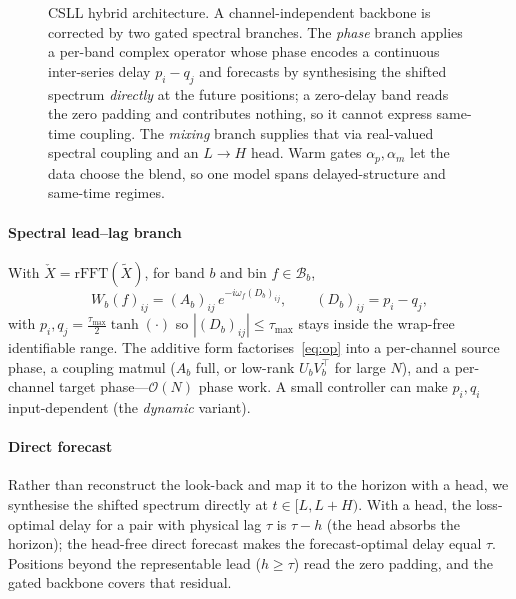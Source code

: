 \documentclass[journal,a4paper]{IEEEtran}
\begin{document}
\begin{figure}[t]
{}
\caption{CSLL hybrid architecture. A channel-independent backbone is corrected by two gated
spectral branches. The \emph{phase} branch applies a per-band complex operator whose phase encodes
a continuous inter-series delay $p_i{-}q_j$ and forecasts by synthesising the shifted spectrum
\emph{directly} at the future positions; a zero-delay band reads the zero padding and contributes
nothing, so it cannot express same-time coupling. The \emph{mixing} branch supplies that via
real-valued spectral coupling and an $L{\to}H$ head. Warm gates $\alpha_p,\alpha_m$ let the data
choose the blend, so one model spans delayed-structure and same-time regimes.}
\label{fig:arch}
\end{figure}

\paragraph{Spectral lead--lag branch} With $\check X=\mathrm{rFFT}(\tilde X)$, for band $b$ and
bin $f\in\mathcal{B}_b$,
\begin{equation}\label{eq:op}
W_b(f)_{ij}=(A_b)_{ij}\,e^{-i\omega_f (D_b)_{ij}},\qquad (D_b)_{ij}=p_i-q_j,
\end{equation}
with $p_i,q_j=\tfrac{\tau_{\max}}{2}\tanh(\cdot)$ so $|(D_b)_{ij}|\le\tau_{\max}$ stays inside the
wrap-free identifiable range. The additive form factorises~\eqref{eq:op} into a per-channel source
phase, a coupling matmul ($A_b$ full, or low-rank $U_bV_b^\top$ for large $N$), and a per-channel
target phase---$\mathcal{O}(N)$ phase work. A small controller can make $p_i,q_i$ input-dependent
(the \emph{dynamic} variant).

\paragraph{Direct forecast} Rather than reconstruct the look-back and map it to the horizon with a
head, we synthesise the shifted spectrum directly at $t\in[L,L+H)$. With a head, the loss-optimal
delay for a pair with physical lag $\tau$ is $\tau-h$ (the head absorbs the horizon); the head-free
direct forecast makes the forecast-optimal delay equal $\tau$. Positions beyond the representable
lead ($h\ge\tau$) read the zero padding, and the gated backbone covers that residual.
\end{document}
